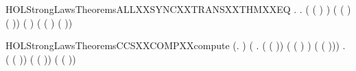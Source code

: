 \begin{SaveVerbatim}{HOLStrongLawsTheoremsALLXXSYNCXXTRANSXXTHMXXEQ}
\HOLTokenTurnstile{} \HOLSymConst{\HOLTokenForall{}}     .
            \HOLTokenTransBegin{}\HOLTokenTransEnd {} \HOLSymConst{\HOLTokenEquiv{}}
       \HOLSymConst{\HOLTokenExists{}}  .
            \HOLSymConst{\HOLTokenLeq{}}  \HOLSymConst{\HOLTokenConj{}}  \HOLSymConst{\HOLTokenLeq{}}  \HOLSymConst{\HOLTokenConj{}} ( ( ) \HOLSymConst{=}  ) \HOLSymConst{\HOLTokenConj{}}
           ( ( ) \HOLSymConst{=}  ( )) \HOLSymConst{\HOLTokenConj{}} ( \HOLSymConst{=} \HOLConst{\ensuremath{\tau}}) \HOLSymConst{\HOLTokenConj{}}
           ( \HOLSymConst{=}  ( ) \HOLSymConst{\ensuremath{\parallel}}  ( ))
\end{SaveVerbatim}
\newcommand{\HOLStrongLawsTheoremsALLXXSYNCXXTRANSXXTHMXXEQ}{\UseVerbatim{HOLStrongLawsTheoremsALLXXSYNCXXTRANSXXTHMXXEQ}}
\begin{SaveVerbatim}{HOLStrongLawsTheoremsCCSXXCOMPXXcompute}
\HOLTokenTurnstile{} (\HOLSymConst{\HOLTokenForall{}}.    \HOLSymConst{=}  ) \HOLSymConst{\HOLTokenConj{}}
   (\HOLSymConst{\HOLTokenForall{}} .
          ( ( )) \HOLSymConst{=}
          ( ( ) \HOLSymConst{\ensuremath{-}} ) \HOLSymConst{\ensuremath{\parallel}}  ( ( ))) \HOLSymConst{\HOLTokenConj{}}
   \HOLSymConst{\HOLTokenForall{}} .
         ( ( )) \HOLSymConst{=}
         ( ( )) \HOLSymConst{\ensuremath{\parallel}}  ( ( ))
\end{SaveVerbatim}
